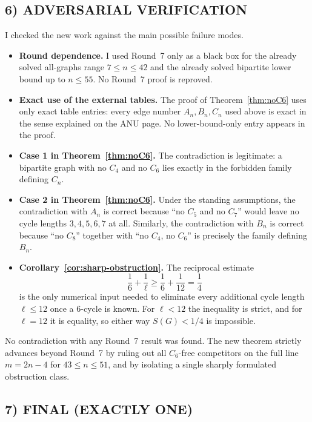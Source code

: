 \subsection*{6) ADVERSARIAL VERIFICATION}

I checked the new work against the main possible failure modes.

\begin{itemize}
\item \textbf{Round dependence.}
I used Round~7 only as a black box for the already solved all-graphs range $7\le n\le 42$ and the already solved bipartite lower bound up to $n\le 55$.
No Round~7 proof is reproved.

\item \textbf{Exact use of the external tables.}
The proof of Theorem~\ref{thm:noC6} uses only exact table entries: every edge number $A_n,B_n,C_n$ used above is exact in the sense explained on the ANU page.
No lower-bound-only entry appears in the proof.

\item \textbf{Case 1 in Theorem~\ref{thm:noC6}.}
The contradiction is legitimate: a bipartite graph with no $C_4$ and no $C_6$ lies exactly in the forbidden family defining $C_n$.

\item \textbf{Case 2 in Theorem~\ref{thm:noC6}.}
Under the standing assumptions, the contradiction with $A_n$ is correct because ``no $C_5$ and no $C_7$'' would leave no cycle lengths $3,4,5,6,7$ at all.
Similarly, the contradiction with $B_n$ is correct because ``no $C_8$'' together with ``no $C_4$, no $C_6$'' is precisely the family defining $B_n$.

\item \textbf{Corollary~\ref{cor:sharp-obstruction}.}
The reciprocal estimate
\[
\frac16+\frac1\ell\ge \frac16+\frac1{12}=\frac14
\]
is the only numerical input needed to eliminate every additional cycle length $\ell\le 12$ once a $6$-cycle is known.
For $\ell<12$ the inequality is strict, and for $\ell=12$ it is equality, so either way $S(G)<1/4$ is impossible.
\end{itemize}

No contradiction with any Round~7 result was found.
The new theorem strictly advances beyond Round~7 by ruling out all $C_6$-free competitors on the full line $m=2n-4$ for $43\le n\le 51$, and by isolating a single sharply formulated obstruction class.

\subsection*{7) FINAL (EXACTLY ONE)}

